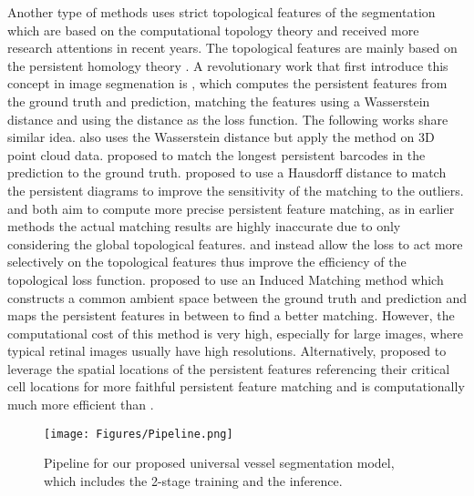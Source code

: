 Another type of methods uses strict topological features of the segmentation which are based on the computational topology theory and received more research attentions in recent years. The topological features are mainly based on the persistent homology theory \cite{Topo-WTLoss, Topo-WTLoss3D, Topo-CMR,  Topo-TPAMI, Topo-TCLoss, Topo-MLLoss, Topo-BMLoss, Topo-SATLoss}. A revolutionary work that first introduce this concept in image segmenation is \cite{Topo-WTLoss}, which computes the persistent features from the ground truth and prediction, matching the features using a Wasserstein distance \cite{Topo-Wassersteinforpersistence} and using the distance as the loss function. The following works share similar idea. \cite{Topo-WTLoss3D} also uses the Wasserstein distance but apply the method on 3D point cloud data. \cite{Topo-MLLoss} proposed to match the longest persistent barcodes in the prediction to the ground truth. \cite{Topo-TCLoss} proposed to use a Hausdorff distance \cite{Topo-Hausdorff_distance} to match the persistent diagrams to improve the sensitivity of the matching to the outliers. \cite{Topo-SATLoss} and \cite{Topo-BMLoss} both aim to compute more precise persistent feature matching, as in earlier methods the actual matching results are highly inaccurate due to only considering the global topological features. \cite{Topo-SATLoss} and \cite{Topo-BMLoss} instead allow the loss to act more selectively on the topological features thus improve the efficiency of the topological loss function. \cite{Topo-BMLoss} proposed to use an Induced Matching \cite{Topo-Induced_matching} method which constructs a common ambient space between the ground truth and prediction and maps the persistent features in between to find a better matching. However, the computational cost of this method is very high, especially for large images, where typical retinal images usually have high resolutions. Alternatively, \cite{Topo-SATLoss} proposed to leverage the spatial locations of the persistent features referencing their critical cell locations for more faithful persistent feature matching and is computationally much more efficient than \cite{Topo-BMLoss}.

\begin{figure*}[ht]
\centering
\texttt{[image: Figures/Pipeline.png]}
\vspace{-0.7cm}
\caption{Pipeline for our proposed universal vessel segmentation model, which includes the 2-stage training and the inference.}
\label{fig:pipeline}
\vspace{-0.6cm}
\end{figure*}